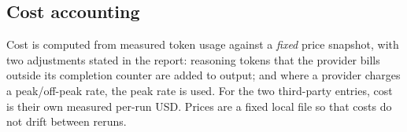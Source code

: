 \subsection{Cost accounting}
Cost is computed from measured token usage against a \emph{fixed} price
snapshot, with two adjustments stated in the report: reasoning tokens that the
provider bills outside its completion counter are added to output; and where a
provider charges a peak/off-peak rate, the peak rate is used. For the two
third-party entries, cost is their own measured per-run USD. Prices are a fixed
local file so that costs do not drift between reruns.
